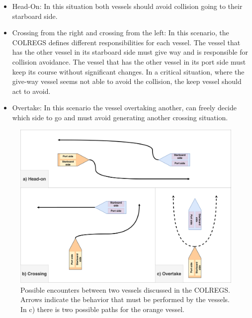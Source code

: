     \begin{itemize}
        \item Head-On: In this situation both vessels should avoid collision going to their starboard side.
        \item Crossing from the right and crossing from the left: In this scenario, the \ac{COLREGS} defines different responsibilities for each vessel. The vessel that has the other vessel in its starboard side must give way and is responsible for collision avoidance. The vessel that has the other vessel in its port side must keep its course without significant changes. In a critical situation, where the give-way vessel seems not able to avoid the collision, the keep vessel should act to avoid.
        \item Overtake: In this scenario the vessel overtaking another, can freely decide which side to go and must avoid generating another crossing situation.
    \end{itemize}
    
    \begin{figure}[H]
        \centering
        \includegraphics[scale=0.125]{figs/Chap2/Encounters.pdf}
        \caption{Possible encounters between two vessels discussed in the \ac{COLREGS}. Arrows indicate the behavior that must be performed by the vessels. In c) there is two possible paths for the orange vessel. }
        \label{fig:chap2_encounters}
    \end{figure}

    
